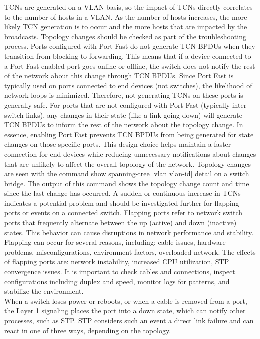\documentclass{article}
\begin{document}
	TCNs are generated on a VLAN basis, so the impact of TCNs directly correlates to the number of hosts in a VLAN. As the number of hosts increases, the more likely TCN generation is to occur and the more hosts that are impacted by the broadcasts. Topology changes should be checked as part of the troubleshooting process. Ports configured with Port Fast do not generate TCN BPDUs when they transition from blocking to forwarding. This means that if a device connected to a Port Fast-enabled port goes online or offline, the switch does not notify the rest of the network about this change through TCN BPDUs. Since Port Fast is typically used on ports connected to end devices (not switches), the likelihood of network loops is minimized. Therefore, not generating TCNs on these ports is generally safe. For ports that are not configured with Port Fast (typically inter-switch links), any changes in their state (like a link going down) will generate TCN BPDUs to inform the rest of the network about the topology change. In essence, enabling Port Fast prevents TCN BPDUs from being generated for state changes on those specific ports. This design choice helps maintain a faster connection for end devices while reducing unnecessary notifications about changes that are unlikely to affect the overall topology of the network. Topology changes are seen with the command show spanning-tree [vlan vlan-id] detail on a switch bridge. The output of this command shows the topology change count and time since the last change has occurred. A sudden or continuous increase in TCNs indicates a potential problem and should be investigated further for flapping ports or events on a connected switch. Flapping ports refer to network switch ports that frequently alternate between the up (active) and down (inactive) states. This behavior can cause disruptions in network performance and stability. Flapping can occur for several reasons, including: cable issues, hardware problems, misconfigurations, environment factors, overloaded network. The effects of flapping ports are: network instability, increased CPU utilization, STP convergence issues. It is important to check cables and connections, inspect configurations including duplex and speed, monitor logs for patterns, and stabilize the environment.\\

	When a switch loses power or reboots, or when a cable is removed from a port, the Layer 1 signaling places the port into a down state, which can notify other processes, such as STP. STP considers such an event a direct link failure and can react in one of three ways, depending on the topology.\\
\end{document}
